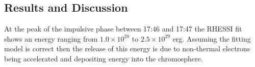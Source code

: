 \subsection{Results and Discussion}
At the peak of the impulsive phase between 17:46 and 17:47 the RHESSI fit shows an energy ranging from $1.0{\times}10^{28}$ to $2.5{\times}10^{29}$ erg. Assuming the fitting model is correct then the release of this energy is due to non-thermal electrons being accelerated and depositing energy into the chromosphere. 


